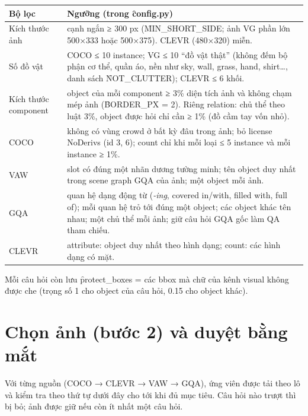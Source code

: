 \documentclass[10.5pt]{article}
\begin{document}
\begin{longtable}{p{3.6cm}p{12.4cm}}
\toprule
\textbf{Bộ lọc} & \textbf{Ngưỡng (trong \f{config.py})}\\
\midrule
Kích thước ảnh & cạnh ngắn ≥ 300 px (\f{MIN\_SHORT\_SIDE}; ảnh VG phần lớn 500×333 hoặc 500×375). CLEVR (480×320) miễn.\\
Số đồ vật & COCO ≤ 10 instance; VG ≤ 10 ``đồ vật thật'' (không đếm bộ phận cơ thể, quần áo, nền như sky,
  wall, grass, hand, shirt\dots, danh sách \f{NOT\_CLUTTER}); CLEVR ≤ 6 khối.\\
Kích thước component & object của mỗi component ≥ 3\% diện tích ảnh và không chạm mép ảnh (\f{BORDER\_PX} = 2).
  Riêng relation: chủ thể theo luật 3\%, object được hỏi chỉ cần ≥ 1\% (đồ cầm tay vốn nhỏ).\\
COCO & không có vùng crowd ở bất kỳ đâu trong ảnh; bỏ license NoDerivs (id 3, 6); count chỉ khi mỗi loại
  ≤ 5 instance và mỗi instance ≥ 1\%.\\
VAW & slot có đúng một nhãn dương tường minh; tên object duy nhất trong scene graph GQA của ảnh; một object mỗi ảnh.\\
GQA & quan hệ dạng động từ (\emph{-ing}, covered in/with, filled with, full of); mỗi quan hệ trỏ tới đúng một
  object; các object khác tên nhau; một chủ thể mỗi ảnh; giữ câu hỏi GQA gốc làm QA tham chiếu.\\
CLEVR & attribute: object duy nhất theo hình dạng; count: các hình dạng có mặt.\\
\bottomrule
\end{longtable}
Mỗi câu hỏi còn lưu \f{protect\_boxes} = các bbox mà chữ của kênh visual không được che (trọng số 1 cho object
của câu hỏi, 0.15 cho object khác).

\section{Chọn ảnh (bước 2) và duyệt bằng mắt}
Với từng nguồn (COCO → CLEVR → VAW → GQA), ứng viên được tải theo lô và kiểm tra theo thứ tự dưới đây cho tới
khi đủ mục tiêu. Câu hỏi nào trượt thì bị bỏ; ảnh được giữ nếu còn ít nhất một câu hỏi.
\end{document}
